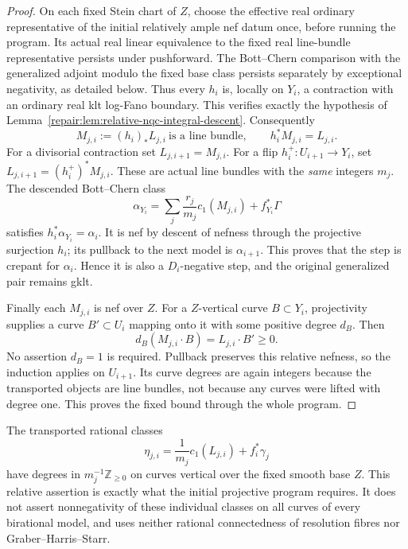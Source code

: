 \begin{proof}
On each fixed Stein chart of $Z$, choose the effective real
ordinary representative of the initial relatively ample nef
datum once, before running the program. Its actual real linear
equivalence to the fixed real line-bundle representative persists
under pushforward. The Bott--Chern comparison with the generalized
adjoint modulo the fixed base class persists separately by
exceptional negativity, as detailed below.
Thus every $h_i$ is, locally on $Y_i$, a contraction with an
ordinary real klt log-Fano boundary. This verifies exactly the
hypothesis of Lemma~\ref{repair:lem:relative-nqc-integral-descent}.
Consequently
\[
 M_{j,i}:=(h_i)_*L_{j,i}\ \text{is a line bundle},\qquad
 h_i^*M_{j,i}=L_{j,i}.
\]
For a divisorial contraction set $L_{j,i+1}=M_{j,i}$.
For a flip $h_i^+:U_{i+1}\to Y_i$, set
$L_{j,i+1}=(h_i^+)^*M_{j,i}$.
These are actual line bundles with the \emph{same} integers $m_j$.
The descended Bott--Chern class
\[
 \alpha_{Y_i}
     =\sum_j\frac{r_j}{m_j}c_1(M_{j,i})+f_{Y_i}^*\Gamma
\]
satisfies $h_i^*\alpha_{Y_i}=\alpha_i$.
It is nef by descent of nefness through the projective surjection
$h_i$; its pullback to the next model is $\alpha_{i+1}$.
This proves that the step is crepant for $\alpha_i$. Hence it is
also a $D_i$-negative step, and the original generalized pair
remains gklt.

Finally each $M_{j,i}$ is nef over $Z$. For a $Z$-vertical curve
$B\subset Y_i$, projectivity supplies a curve $B'\subset U_i$
mapping onto it with some positive degree $d_B$. Then
\[
 d_B(M_{j,i}\cdot B)=L_{j,i}\cdot B'\geq0.
\]
No assertion $d_B=1$ is required. Pullback preserves this relative
nefness, so the induction applies on $U_{i+1}$. Its curve degrees
are again integers because the transported objects are line
bundles, not because any curves were lifted with degree one.
This proves the fixed bound through the whole program.
\end{proof}

\begin{remark}
The transported rational classes
\[
 \eta_{j,i}=\frac1{m_j}c_1(L_{j,i})+f_i^*\gamma_j
\]
have degrees in $m_j^{-1}\mathbb Z_{\geq0}$ on curves vertical over
the fixed smooth base $Z$. This relative assertion is exactly what
the initial projective program requires. It does not assert
nonnegativity of these individual classes on all curves of every
birational model, and uses neither rational connectedness of
resolution fibres nor Graber--Harris--Starr.
\end{remark}


